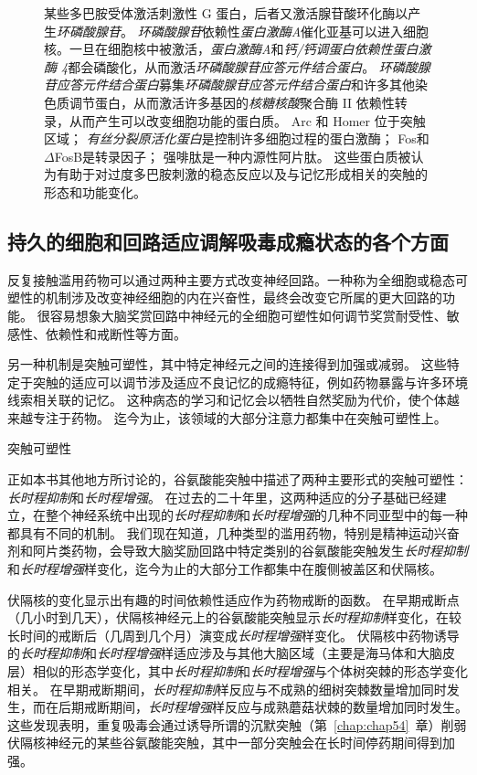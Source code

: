 \begin{figure}[htbp]
{		某些多巴胺受体激活刺激性 G 蛋白，后者又激活腺苷酸环化酶以产生\textit{环磷酸腺苷}。
		\textit{环磷酸腺苷}依赖性\textit{蛋白激酶A}催化亚基可以进入细胞核。一旦在细胞核中被激活，\textit{蛋白激酶A}和\textit{钙/钙调蛋白依赖性蛋白激酶 4}都会磷酸化，从而激活\textit{环磷酸腺苷应答元件结合蛋白}。
		\textit{环磷酸腺苷应答元件结合蛋白}募集\textit{环磷酸腺苷应答元件结合蛋白}和许多其他染色质调节蛋白，从而激活许多基因的\textit{核糖核酸}聚合酶 II 依赖性转录，从而产生可以改变细胞功能的蛋白质。
		Arc 和 Homer 位于突触区域；
		\textit{有丝分裂原活化蛋白}是控制许多细胞过程的蛋白激酶；
		Fos和$\Delta$FosB是转录因子；
		强啡肽是一种内源性阿片肽。
		这些蛋白质被认为有助于对过度多巴胺刺激的稳态反应以及与记忆形成相关的突触的形态和功能变化。}
	\label{fig:43_6}
\end{figure}



\subsection{持久的细胞和回路适应调解吸毒成瘾状态的各个方面}

反复接触滥用药物可以通过两种主要方式改变神经回路。一种称为全细胞或稳态可塑性的机制涉及改变神经细胞的内在兴奋性，最终会改变它所属的更大回路的功能。
很容易想象大脑奖赏回路中神经元的全细胞可塑性如何调节奖赏耐受性、敏感性、依赖性和戒断性等方面。


另一种机制是突触可塑性，其中特定神经元之间的连接得到加强或减弱。
这些特定于突触的适应可以调节涉及适应不良记忆的成瘾特征，例如药物暴露与许多环境线索相关联的记忆。
这种病态的学习和记忆会以牺牲自然奖励为代价，使个体越来越专注于药物。
迄今为止，该领域的大部分注意力都集中在突触可塑性上。


突触可塑性

正如本书其他地方所讨论的，谷氨酸能突触中描述了两种主要形式的突触可塑性：
\textit{长时程抑制}和\textit{长时程增强}。
在过去的二十年里，这两种适应的分子基础已经建立，在整个神经系统中出现的\textit{长时程抑制}和\textit{长时程增强}的几种不同亚型中的每一种都具有不同的机制。
我们现在知道，几种类型的滥用药物，特别是精神运动兴奋剂和阿片类药物，会导致大脑奖励回路中特定类别的谷氨酸能突触发生\textit{长时程抑制}和\textit{长时程增强}样变化，迄今为止的大部分工作都集中在腹侧被盖区和伏隔核。


伏隔核的变化显示出有趣的时间依赖性适应作为药物戒断的函数。
在早期戒断点（几小时到几天），伏隔核神经元上的谷氨酸能突触显示\textit{长时程抑制}样变化，在较长时间的戒断后（几周到几个月）演变成\textit{长时程增强}样变化。
伏隔核中药物诱导的\textit{长时程抑制}和\textit{长时程增强}样适应涉及与其他大脑区域（主要是海马体和大脑皮层）相似的形态学变化，其中\textit{长时程抑制}和\textit{长时程增强}与个体树突棘的形态学变化相关。
在早期戒断期间，\textit{长时程抑制}样反应与不成熟的细树突棘数量增加同时发生，而在后期戒断期间，\textit{长时程增强}样反应与成熟蘑菇状棘的数量增加同时发生。
这些发现表明，重复吸毒会通过诱导所谓的沉默突触（第~\ref{chap:chap54}~章）削弱伏隔核神经元的某些谷氨酸能突触，其中一部分突触会在长时间停药期间得到加强。


